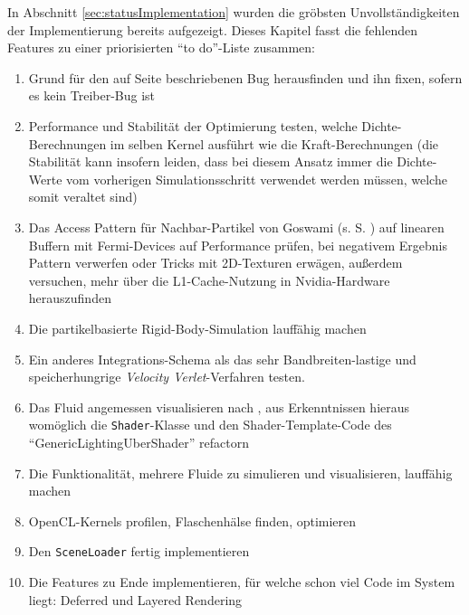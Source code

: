   	In Abschnitt \ref{sec:statusImplementation} wurden die gröbsten Unvollständigkeiten der Implementierung
	bereits aufgezeigt. Dieses Kapitel fasst die fehlenden Features zu einer priorisierten
	"`to do"'-Liste zusammen:\\
	\begin{enumerate}
		\item Grund für den auf Seite \pageref{enum:oclSyncBug} beschriebenen Bug herausfinden und ihn fixen,
		sofern es kein Treiber-Bug ist
		\item Performance und Stabilität der Optimierung testen, welche Dichte-Berechnungen im selben
		Kernel ausführt wie die Kraft-Berechnungen (die Stabilität kann insofern leiden, dass bei diesem Ansatz
		immer die Dichte-Werte vom vorherigen Simulationsschritt verwendet werden müssen, welche somit veraltet sind)
		\item Das Access Pattern für Nachbar-Partikel von Goswami (s. S. \pageref{enum:goswamiAccessPattern})
			 auf linearen Buffern mit Fermi-Devices auf Performance prüfen, bei negativem Ergebnis Pattern verwerfen
			 oder Tricks mit 2D-Texturen erwägen, außerdem versuchen, mehr über die L1-Cache-Nutzung in Nvidia-Hardware
			 herauszufinden
		\item Die partikelbasierte Rigid-Body-Simulation lauffähig machen
		\item Ein anderes Integrations-Schema als das sehr Bandbreiten-lastige und speicherhungrige 
			\emph{Velocity Verlet}-Verfahren testen.
		\item Das Fluid angemessen visualisieren nach \cite{Green2009FluidRenderingCurvatureFlow}, aus Erkenntnissen
		hieraus womöglich die \lstinline|Shader|-Klasse und den Shader-Template-Code des
		"`GenericLightingUberShader"' refactorn
		\item Die Funktionalität, mehrere Fluide zu simulieren und visualisieren, lauffähig machen
		\item OpenCL-Kernels profilen, Flaschenhälse finden, optimieren
		\item Den \lstinline|SceneLoader| fertig implementieren
		\item Die Features zu Ende implementieren, für welche schon viel Code im System liegt: 
		Deferred und Layered Rendering

\end{enumerate}

